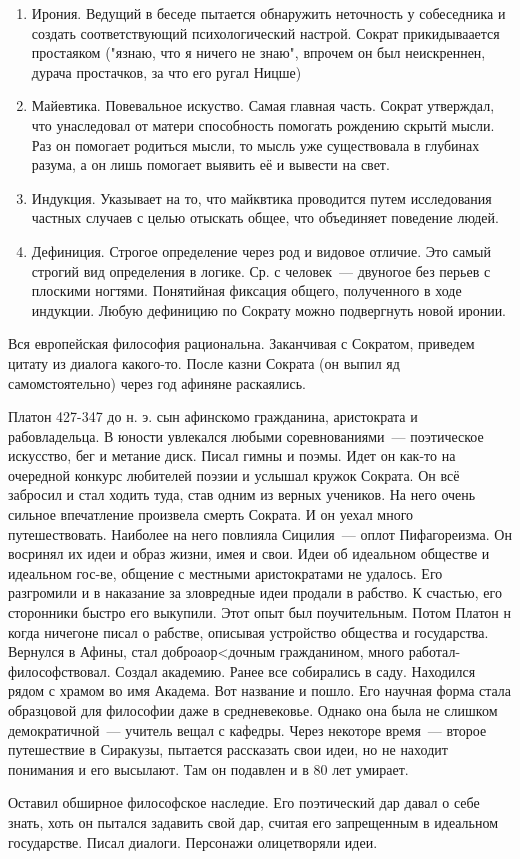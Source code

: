 \begin{enumerate}
	\item Ирония. Ведущий в беседе пытается обнаружить неточность у собеседника и создать соответствующий психологический настрой. 
	Сократ прикидываается простаяком ("язнаю, что я ничего не знаю", впрочем он был неискреннен, дурача простачков, за что его ругал Ницше) 
	\item Майевтика. Повевальное искуство. Самая главная часть. Сократ утверждал, что унаследовал от матери способность помогать рождению скрытй мысли. 
	Раз он помогает родиться мысли, то мысль уже существовала в глубинах разума, а он лишь помогает выявить её и вывести на свет. 
	\item Индукция. Указывает на то, что майквтика проводится путем исследования частных случаев с целью отыскать общее, что объединяет поведение людей. 
	\item Дефиниция. Строгое определение через род и видовое отличие. Это самый строгий вид определения в логике. Ср. с человек~--- двуногое без перьев с плоскими ногтями. 
	Понятийная фиксация общего, полученного в ходе индукции. Любую дефиницию по Сократу можно подвергнуть новой иронии.
\end{enumerate}
	 

Вся европейская философия рациональна. 
Заканчивая с Сократом, приведем цитату из диалога какого-то. 
После казни Сократа (он выпил яд самомстоятельно) через год афиняне раскаялись. 

Платон
427-347 до н. э. сын афинскомо гражданина, аристократа и рабовладельца. В юности увлекался любыми соревнованиями~--- поэтическое искусство, бег и метание диск. Писал гимны и поэмы. 
Идет он как-то на очередной конкурс любителей поэзии и услышал кружок Сократа. Он всё забросил и стал ходить туда, став одним из верных учеников. На него очень сильное впечатление произвела смерть Сократа. 
И он уехал много путешествовать. Наиболее на него повлияла Сицилия~--- оплот Пифагореизма. 
Он восринял их идеи и образ жизни, имея и свои. Идеи об идеальном обществе и идеальном гос-ве, общение с местными аристократами не удалось. 
Его разгромили и в наказание за зловредные идеи продали в рабство. К счастью, его сторонники быстро его выкупили. Этот опыт был поучительным. 
Потом Платон н когда ничегоне писал о рабстве, описывая устройство общества и государства. Вернулся в Афины, стал доброаор<дочным гражданином, много работал-философствовал. 
Создал академию. Ранее все собирались в саду. Находился рядом с храмом во имя Академа. Вот название и пошло. Его научная форма стала образцовой для философии даже в средневековье. 
Однако она была не слишком демократичной~--- учитель вещал с кафедры. Через некоторе время~--- второе путешествие в Сиракузы, пытается рассказать свои идеи, но не находит понимания и его высылают. Там он подавлен и в 80 лет умирает. 

Оставил обширное философское наследие. Его поэтический дар давал о себе знать, хоть он пытался задавить свой дар, считая его запрещенным в идеальном государстве. Писал диалоги. Персонажи олицетворяли идеи. 
